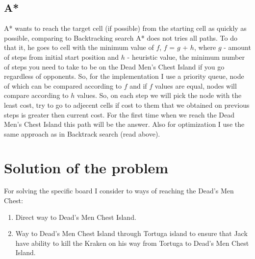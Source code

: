 \documentclass[a4paper]{article}
\begin{document}
\subsection{A*}
A* wants to reach the target cell (if possible) from the starting cell as quickly as possible, comparing to Backtracking search A* does not tries all paths. To do that it, he goes to cell with the minimum value of \emph{$f$}, \emph{$f$} = \emph{$g$} + \emph{$h$}, where \emph{$g$} - amount of steps from initial start position and \emph{$h$} - heuristic value, the minimum number of steps you need to take to be on the Dead Men's Chest Island if you go regardless of opponents. So, for the implementation I use a priority queue, node of which can be compared according to \emph{$f$} and if \emph{$f$} values are equal, nodes will compare according to \emph{$h$} values. So, on each step we will pick the node with the least cost, try to go to adjecent cells if cost to them that we obtained on previous steps is greater then current cost. For the first time when we reach the Dead Men's Chest Island this path will be the answer. Also for optimization I use the same approach as in Backtrack search (read above).


\section{Solution of the problem}
For solving the specific board I consider to ways of reaching the Dead's Men Chest:
\begin{enumerate}
    \item Direct way to Dead's Men Chest Island.
    \item Way to Dead's Men Chest Island through Tortuga island to ensure that Jack have ability to kill the Kraken on his way from Tortuga to Dead's Men Chest Island.
\end{enumerate}
\end{document}
